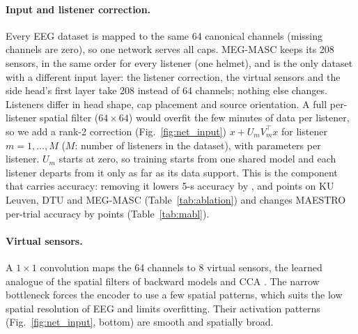 \documentclass[twoside]{article}
\begin{document}
\begin{table}[h]\centering\small
\caption{CoupleFlow modules and parameter counts (KU Leuven checkpoint; $^\ast$envelope-only
input). GN: GroupNorm; GELU: Gaussian error linear unit; MLP: multilayer perceptron. Only the rows in the decision path are needed at test time for the
coupling decision; the flow head is needed for the PMI rule.}\label{tab:arch}

\end{table}

\paragraph{Input and listener correction.} Every EEG dataset is mapped to the same 64
canonical channels (missing channels are zero), so one network serves all caps. MEG-MASC
keeps its 208 sensors, in the same order for every listener (one helmet), and is the only
dataset with a different input layer: the listener correction, the virtual sensors and the
side head's first layer take 208 instead of 64 channels; nothing else changes. Listeners
differ in head shape, cap placement and source orientation. A full per-listener spatial
filter ($64\times64$) would overfit the few minutes of data per listener, so we add a
rank-2 correction (Fig.~\ref{fig:net_input}) $x+U_m V_m^{\top}x$ for listener $m=1,\dots,M$
($M$: number of listeners in the dataset), with \archPerListener{} parameters per listener. $U_m$ starts at zero, so training starts from one shared
model and each listener departs from it only as far as its data support. This is the
component that carries accuracy: removing it lowers 5-s accuracy by \ablRankKUL, \ablRankDTU{} and \ablRankMEG{} points on
KU Leuven, DTU and MEG-MASC
(Table~\ref{tab:ablation}) and changes MAESTRO per-trial accuracy by \maAblRank{} points
(Table~\ref{tab:mabl}).

\paragraph{Virtual sensors.} A $1{\times}1$ convolution maps the 64 channels to 8
virtual sensors, the learned analogue of the spatial filters of backward models and CCA
\citep{crosse2016mtrf,decheveigne2018decoding}. The narrow bottleneck forces the encoder
to use a few spatial patterns, which suits the low spatial resolution of EEG and limits
overfitting. Their activation patterns (Fig.~\ref{fig:net_input}, bottom) are smooth and
spatially broad.
\end{document}
